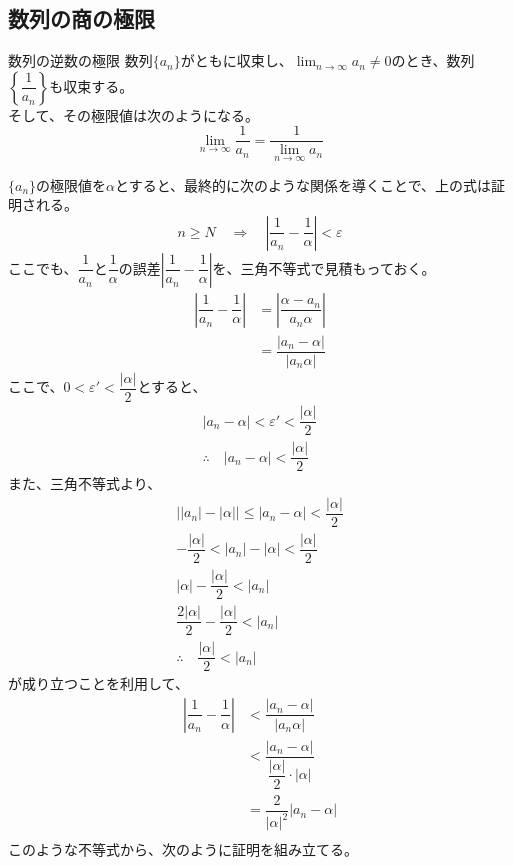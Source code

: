 \documentclass[../../imaging-math]{subfiles}
\begin{document}
\subsection{数列の商の極限}

\begin{theorem}{数列の逆数の極限}
  \titlegap
  数列$\{a_n\}$がともに収束し、$\displaystyle\lim_{n \to \infty} a_n \neq 0$のとき、数列$\left\{\dfrac{1}{a_n}\right\}$も収束する。\\
  そして、その極限値は次のようになる。
  \LARGE
  \begin{equation}
    \lim_{n \to \infty} \dfrac{1}{a_n} = \dfrac{1}{\displaystyle\lim_{n \to \infty} a_n}
  \end{equation}
\end{theorem}

$\{a_n\}$の極限値を$\alpha$とすると、最終的に次のような関係を導くことで、上の式は証明される。
\begin{equation}
  n \geq N \quad \Longrightarrow \quad \left|\dfrac{1}{a_n} - \dfrac{1}{\alpha}\right| < \varepsilon
\end{equation}
ここでも、$\dfrac{1}{a_n}$と$\dfrac{1}{\alpha}$の誤差$\left|\dfrac{1}{a_n} - \dfrac{1}{\alpha}\right|$を、三角不等式で見積もっておく。
\begin{align*}
  \left|\dfrac{1}{a_n} - \dfrac{1}{\alpha}\right| & = \left|\dfrac{\alpha - a_n}{a_n \alpha}\right| \\
                                                  & = \dfrac{|a_n - \alpha|}{|a_n \alpha|}
\end{align*}
ここで、$0< \varepsilon' < \dfrac{|\alpha|}{2}$とすると、
\begin{gather*}
  \left|a_n - \alpha\right| < \varepsilon' < \dfrac{|\alpha|}{2} \\
  \therefore \quad \left|a_n-\alpha\right| < \dfrac{\left|\alpha\right|}{2}
\end{gather*}
また、三角不等式より、
\begin{gather*}
  \left| |a_n| - |\alpha| \right| \leq |a_n - \alpha| < \dfrac{\left|\alpha\right|}{2} \\
  - \dfrac{|\alpha|}{2} < |a_n| - |\alpha| < \dfrac{|\alpha|}{2} \\
  |\alpha| - \dfrac{|\alpha|}{2} < |a_n| \\
  \dfrac{2|\alpha|}{2} - \dfrac{|\alpha|}{2} < |a_n| \\
  \therefore \quad \dfrac{|\alpha|}{2} < |a_n|
\end{gather*}
が成り立つことを利用して、
\begin{align*}
  \left|\dfrac{1}{a_n} - \dfrac{1}{\alpha}\right| & < \dfrac{|a_n - \alpha|}{|a_n \alpha|}                                             \\
                                                  & < \dfrac{|a_n - \alpha|}{\dfrac{\left|\alpha\right|}{2} \cdot \left|\alpha\right|} \\
                                                  & = \dfrac{2}{|\alpha|^2}|a_n - \alpha|                                              \\
\end{align*}
このような不等式から、次のように証明を組み立てる。
\end{document}
